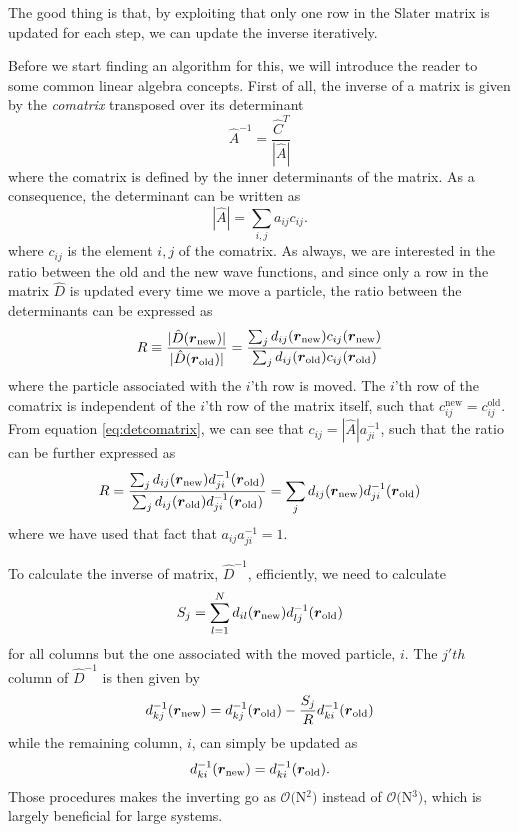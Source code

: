 The good thing is that, by exploiting that only one row in the Slater matrix is updated for each step, we can update the inverse iteratively. 

Before we start finding an algorithm for this, we will introduce the reader to some common linear algebra concepts. First of all, the inverse of a matrix is given by the \textit{comatrix} transposed over its determinant
\begin{equation}
\hat{A}^{-1}=\frac{\hat{C}^T}{|\hat{A}|}
\end{equation}
where the comatrix is defined by the inner determinants of the matrix. \cite{weisstein_matrix_nodate} As a consequence, the determinant can be written as 
\begin{equation}
|\hat{A}|=\sum_{i,j}a_{ij}c_{ij}.
\label{eq:detcomatrix}
\end{equation}
where $c_{ij}$ is the element $i,j$ of the comatrix. As always, we are interested in the ratio between the old and the new wave functions, and since only a row in the matrix $\hat{D}$ is updated every time we move a particle, the ratio between the determinants can be expressed as
\begin{equation}
R\equiv \frac{|\hat{D}(\boldsymbol{{r}}_{\text{new}})|}{|\hat{D}(\boldsymbol{{r}}_{\text{old}})|}=\frac{\sum_{j}d_{ij}(\boldsymbol{{r}}_{\text{new}})c_{ij}(\boldsymbol{{r}}_{\text{new}})}{\sum_{j}d_{ij}(\boldsymbol{{r}}_{\text{old}})c_{ij}(\boldsymbol{{r}}_{\text{old}})}
\end{equation}
where the particle associated with the $i$'th row is moved. The $i$'th row of the comatrix is independent of the $i$'th row of the matrix itself, such that $c_{ij}^{\text{new}}=c_{ij}^{\text{old}}$. From equation \eqref{eq:detcomatrix}, we can see that $c_{ij}=|\hat{A}|a_{ji}^{-1}$, such that the ratio can be further expressed as
\begin{equation}
R=\frac{\sum_{j}d_{ij}(\boldsymbol{{r}}_{\text{new}})d_{ji}^{-1}(\boldsymbol{{r}}_{\text{old}})}{\sum_{j}d_{ij}(\boldsymbol{{r}}_{\text{old}})d_{ji}^{-1}(\boldsymbol{{r}}_{\text{old}})}=\sum_{j}d_{ij}(\boldsymbol{{r}}_{\text{new}})d_{ji}^{-1}(\boldsymbol{{r}}_{\text{old}})
\end{equation}
where we have used that fact that $a_{ij}a_{ji}^{-1}=1$.

To calculate the inverse of matrix, $\hat{D}^{-1}$, efficiently, we need to calculate 
\begin{equation}
S_j=\sum_{l=1}^Nd_{il}(\boldsymbol{{r}}_{\text{new}})d_{lj}^{-1}(\boldsymbol{{r}}_{\text{old}})
\end{equation}
for all columns but the one associated with the moved particle, $i$. The $j'th$ column of $\hat{D}^{-1}$ is then given by 
\begin{equation}
d_{kj}^{-1}(\boldsymbol{{r}}_{\text{new}})=d_{kj}^{-1}(\boldsymbol{{r}}_{\text{old}})-\frac{S_j}{R}d_{ki}^{-1}(\boldsymbol{{r}}_{\text{old}})
\end{equation}
while the remaining column, $i$, can simply be updated as
\begin{equation}
d_{ki}^{-1}(\boldsymbol{{r}}_{\text{new}})=d_{ki}^{-1}(\boldsymbol{{r}}_{\text{old}}).
\end{equation}
Those procedures makes the inverting go as $\mathcal{O}($N$^2)$ instead of $\mathcal{O}($N$^3)$, which is largely beneficial for large systems. \cite{morten_hjorth-jensen_computational_2019}

